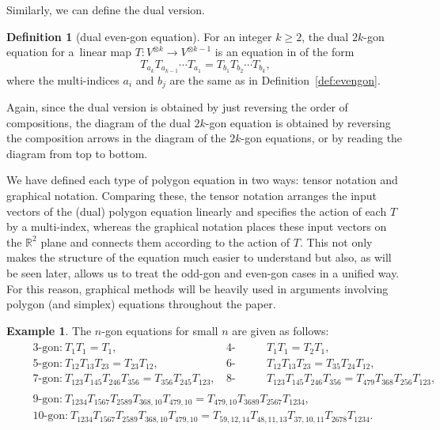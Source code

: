 \documentclass[10pt,a4paper]{amsart}
\numberwithin{equation}{section}
\theoremstyle{definition}
\newtheorem{Definition}[Theorem]{Definition}
\newtheorem{Example}[Theorem]{Example}
\begin{document}
Similarly, we can define the dual version.
\begin{Definition}[dual even-gon equation]
 For an integer $k\geq 2$, the dual $2k$-gon equation for a~linear map $T\colon V^{\otimes k}\to V^{\otimes k-1}$ is an equation in  of the form
 \begin{equation*}
 T_{a_k}T_{a_{k-1}}\cdots T_{a_1} = T_{b_1}T_{b_2}\cdots T_{b_k},
 \end{equation*}
 where the multi-indices $a_i$ and $b_j$ are the same as in Definition~\ref{def:evengon}.

 Again, since the dual version is obtained by just reversing the order of compositions, the diagram of the dual $2k$-gon equation is obtained by reversing the composition arrows in the diagram of the $2k$-gon equations, or by reading the diagram from top to bottom.
\end{Definition}



We have defined each type of polygon equation in two ways: tensor notation and graphical notation. Comparing these, the tensor notation arranges the input vectors of the (dual) polygon equation linearly and specifies the action of each $T$ by a multi-index, whereas the graphical notation places these input vectors on the $\mathbb{R}^2$ plane and connects them according to the action of $T$. This not only makes the structure of the equation much easier to understand but also, as will be seen later, allows us to treat the odd-gon and even-gon cases in a unified way. For this reason, graphical methods will be heavily used in arguments involving polygon (and simplex) equations throughout the paper.



\begin{Example}
 The $n$-gon equations for small $n$ are given as follows:
\begin{align*}
 &\begin{aligned}
 &\text{{3-gon:}}\ T_{1}T_{1}=T_{1}, & \text{{4-gon:}}&\quad T_{1}T_{1}=T_{2}T_{1},\\
 &\text{{5-gon:}}\ T_{12}T_{13}T_{23}=T_{23}T_{12}, & \text{{6-gon:}}&\quad T_{12}T_{13}T_{23}=T_{35}T_{24}T_{12},\\
 &\text{{7-gon:}}\ T_{123}T_{145}T_{246}T_{356}=T_{356}T_{245}T_{123},\quad & \text{{8-gon:}}&\quad T_{123}T_{145}T_{246}T_{356}=T_{479}T_{368}T_{256}T_{123},
 \end{aligned}\\
 &\begin{aligned}
 &\text{{9-gon:}}\ T_{1234}T_{1567}T_{2589}T_{368,10}T_{479,10}=T_{479,10}T_{3689}T_{2567}T_{1234},\\
 &\text{{10-gon:}}\ T_{1234}T_{1567}T_{2589}T_{368,10}T_{479,10}=T_{59,12,14}T_{48,11,13}T_{37,10,11}T_{2678}T_{1234}.
 \end{aligned}
\end{align*}
\end{Example}
\end{document}
